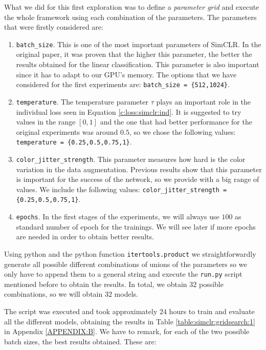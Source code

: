 What we did for this first exploration was to define a \emph{parameter grid} and execute the whole framework using each combination of the parameters. The parameters that were firstly considered are:
\begin{enumerate}
\item \lstinline{batch_size}. This is one of the most important parameters of SimCLR. In the original paper, it was proven that the higher this parameter, the better the results obtained for the linear classification. This parameter is also important since it has to adapt to our GPU's memory. The options that we have considered for the first experiments are: \lstinline|batch_size = {512,1024}|.

\item \lstinline{temperature}. The temperature parameter $\tau$ plays an important role in the individual loss seen in Equation \eqref{c:loss:simclr:ind}. It is suggested to try values in the range $[0,1]$ and the one that had better performance for the original experiments was around $0.5$, so we chose the following values: \lstinline|temperature = {0.25,0.5,0.75,1}|.

\item \lstinline{color_jitter_strength}. This parameter measures how hard is the color variation in the data augmentation. Previous results show that this parameter is important for the success of the network, so we provide with a big range of values. We include the following values: \lstinline|color_jitter_strength = {0.25,0.5,0.75,1}|.

\item \lstinline{epochs}. In the first stages of the experiments, we will always use $100$ as standard number of epoch for the trainings. We will see later if more epochs are needed in order to obtain better results.
\end{enumerate}

Using python and the python function \lstinline{itertools.product} we straightforwardly generate all possible different combinations of unions of the parameters so we only have to append them to a general string and execute the \lstinline{run.py} script mentioned before to obtain the results. In total, we obtain $32$ possible combinations, so we will obtain $32$ models. 

The script was executed and took approximately $24$ hours to train and evaluate all the different models, obtaining the results in Table \ref{table:simclr:gridsearch:1} in Appendix \ref{APPENDIX:B}. We have to remark, for each of the two possible batch sizes, the best results obtained. These are:

